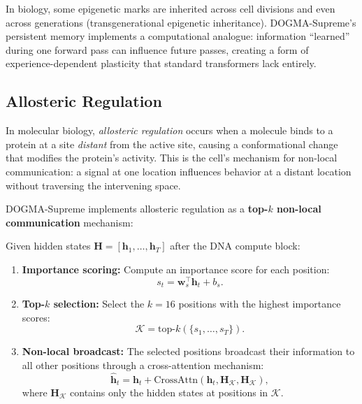 \begin{bioinsight}
In biology, some epigenetic marks are inherited across cell divisions and even across generations (transgenerational epigenetic inheritance). DOGMA-Supreme's persistent memory implements a computational analogue: information ``learned'' during one forward pass can influence future passes, creating a form of experience-dependent plasticity that standard transformers lack entirely.
\end{bioinsight}

\subsection{Allosteric Regulation}
\label{sec:allosteric}

In molecular biology, \emph{allosteric regulation} occurs when a molecule binds to a protein at a site \emph{distant} from the active site, causing a conformational change that modifies the protein's activity. This is the cell's mechanism for non-local communication: a signal at one location influences behavior at a distant location without traversing the intervening space.

DOGMA-Supreme implements allosteric regulation as a \textbf{top-$k$ non-local communication} mechanism:

\begin{dogmadef}
Given hidden states $\mathbf{H} = [\mathbf{h}_1, \ldots, \mathbf{h}_T]$ after the DNA compute block:
\begin{enumerate}[leftmargin=1.5em]
  \item \textbf{Importance scoring:} Compute an importance score for each position:
  \begin{equation}
    s_t = \mathbf{w}_s^\top \mathbf{h}_t + b_s.
  \end{equation}
  \item \textbf{Top-$k$ selection:} Select the $k = 16$ positions with the highest importance scores:
  \begin{equation}
    \mathcal{K} = \text{top-}k(\{s_1, \ldots, s_T\}).
  \end{equation}
  \item \textbf{Non-local broadcast:} The selected positions broadcast their information to all other positions through a cross-attention mechanism:
  \begin{equation}
    \hat{\mathbf{h}}_t = \mathbf{h}_t + \text{CrossAttn}(\mathbf{h}_t, \mathbf{H}_{\mathcal{K}}, \mathbf{H}_{\mathcal{K}}),
  \end{equation}
  where $\mathbf{H}_{\mathcal{K}}$ contains only the hidden states at positions in $\mathcal{K}$.
\end{enumerate}
\end{dogmadef}

